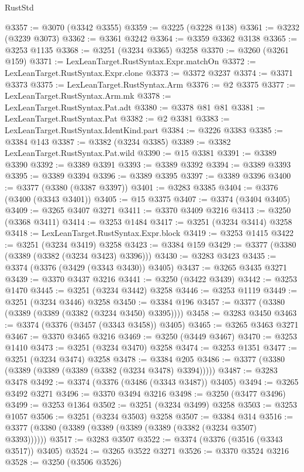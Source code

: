 \begin{lexlean}{RustStd}
\begin{coremodule}
@3357 := @3070 (@3342 @3355)
@3359 := @3225 (@3228 @138)
@3361 := @3232 (@3239 @3073)
@3362 := @3361 @3242
@3364 := @3359 @3362 @3138
@3365 := @3253 @1135
@3368 := @3251 (@3234 @3365) @3258
@3370 := @3260 (@3261 @159)
@3371 := LexLeanTarget.RustSyntax.Expr.matchOn
@3372 := LexLeanTarget.RustSyntax.Expr.clone
@3373 := @3372 @3237
@3374 := @3371 @3373
@3375 := LexLeanTarget.RustSyntax.Arm
@3376 := @2 @3375
@3377 := LexLeanTarget.RustSyntax.Arm.mk
@3378 := LexLeanTarget.RustSyntax.Pat.adt
@3380 := @3378 @81 @81
@3381 := LexLeanTarget.RustSyntax.Pat
@3382 := @2 @3381
@3383 := LexLeanTarget.RustSyntax.IdentKind.part
@3384 := @3226 @3383
@3385 := @3384 @143
@3387 := @3382 (@3234 @3385)
@3389 := @3382 LexLeanTarget.RustSyntax.Pat.wild
@3390 := @15 @3381
@3391 := @3389 @3390
@3392 := @3389 @3391
@3393 := @3389 @3392
@3394 := @3389 @3393
@3395 := @3389 @3394
@3396 := @3389 @3395
@3397 := @3389 @3396
@3400 := @3377 (@3380 (@3387 @3397))
@3401 := @3283 @3385
@3404 := @3376 (@3400 (@3343 @3401))
@3405 := @15 @3375
@3407 := @3374 (@3404 @3405)
@3409 := @3265 @3407 @3271
@3411 := @3370 @3409 @3216
@3413 := @3250 (@3368 @3411)
@3414 := @3253 @1484
@3417 := @3251 (@3234 @3414) @3258
@3418 := LexLeanTarget.RustSyntax.Expr.block
@3419 := @3253 @1415
@3422 := @3251 (@3234 @3419) @3258
@3423 := @3384 @159
@3429 := @3377 (@3380 (@3389 (@3382 (@3234 @3423) @3396)))
@3430 := @3283 @3423
@3435 := @3374 (@3376 (@3429 (@3343 @3430)) @3405)
@3437 := @3265 @3435 @3271
@3439 := @3370 @3437 @3216
@3441 := @3250 (@3422 @3439)
@3442 := @3253 @1470
@3445 := @3251 (@3234 @3442) @3258
@3446 := @3253 @1119
@3449 := @3251 (@3234 @3446) @3258
@3450 := @3384 @196
@3457 := @3377 (@3380 (@3389 (@3389 (@3382 (@3234 @3450) @3395))))
@3458 := @3283 @3450
@3463 := @3374 (@3376 (@3457 (@3343 @3458)) @3405)
@3465 := @3265 @3463 @3271
@3467 := @3370 @3465 @3216
@3469 := @3250 (@3449 @3467)
@3470 := @3253 @1410
@3473 := @3251 (@3234 @3470) @3258
@3474 := @3253 @1351
@3477 := @3251 (@3234 @3474) @3258
@3478 := @3384 @205
@3486 := @3377 (@3380 (@3389 (@3389 (@3389 (@3382 (@3234 @3478) @3394)))))
@3487 := @3283 @3478
@3492 := @3374 (@3376 (@3486 (@3343 @3487)) @3405)
@3494 := @3265 @3492 @3271
@3496 := @3370 @3494 @3216
@3498 := @3250 (@3477 @3496)
@3499 := @3253 @1364
@3502 := @3251 (@3234 @3499) @3258
@3503 := @3253 @1057
@3506 := @3251 (@3234 @3503) @3258
@3507 := @3384 @314
@3516 := @3377 (@3380 (@3389 (@3389 (@3389 (@3389 (@3382 (@3234 @3507) @3393))))))
@3517 := @3283 @3507
@3522 := @3374 (@3376 (@3516 (@3343 @3517)) @3405)
@3524 := @3265 @3522 @3271
@3526 := @3370 @3524 @3216
@3528 := @3250 (@3506 @3526)

\end{coremodule}
\end{lexlean}
